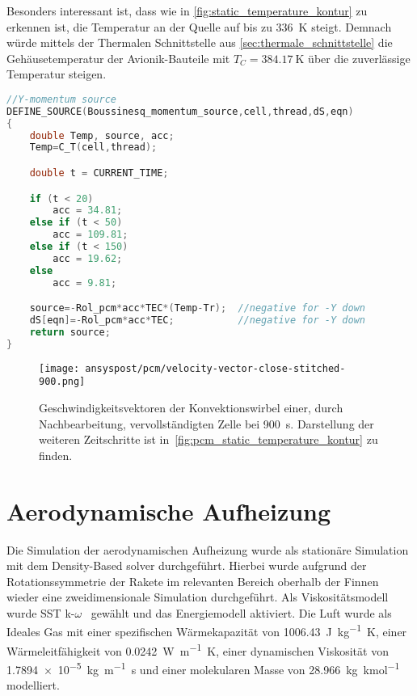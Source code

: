 Besonders interessant ist, dass wie in \ref{fig:static_temperature_kontur} zu erkennen ist, die Temperatur an der Quelle auf bis zu \SI{336}{\kelvin}
steigt. Demnach würde mittels der Thermalen Schnittstelle aus \ref{sec:thermale_schnittstelle} die Gehäusetemperatur der Avionik-Bauteile mit
$T_C = \SI{384,17}{\kelvin}$ über die zuverlässige Temperatur steigen.

\begin{lstlisting}[language=C, float, caption={Boussinesq-Approximation des Auftriebs im \ac{pcm} in der \ac{udf} eicosane.c}, label={lst:udf_bossinesque}]
//Y-momentum source
DEFINE_SOURCE(Boussinesq_momentum_source,cell,thread,dS,eqn)
{
	double Temp, source, acc;
	Temp=C_T(cell,thread);

	double t = CURRENT_TIME;

	if (t < 20)
		acc = 34.81;
	else if (t < 50)
		acc = 109.81;
	else if (t < 150)
		acc = 19.62;
	else
		acc = 9.81;

	source=-Rol_pcm*acc*TEC*(Temp-Tr);  //negative for -Y down
	dS[eqn]=-Rol_pcm*acc*TEC; 			//negative for -Y down
	return source;
}
\end{lstlisting}

\begin{figure}
  \centering
  \texttt{[image: ansyspost/pcm/velocity-vector-close-stitched-900.png]}
  \caption{Geschwindigkeitsvektoren der Konvektionswirbel einer, durch Nachbearbeitung, vervollständigten Zelle
  bei \SI{900}{\second}. Darstellung der weiteren Zeitschritte ist in~\ref{fig:pcm_static_temperature_kontur} zu finden.}\label{fig:pcm_vectoren_stitched}
\end{figure}

\section{Aerodynamische Aufheizung}\label{sec:sim_aerodynamisch}
Die Simulation der aerodynamischen Aufheizung wurde als stationäre Simulation mit dem Density-Based solver durchgeführt. Hierbei wurde
aufgrund der Rotationssymmetrie der Rakete im relevanten Bereich oberhalb der Finnen wieder eine zweidimensionale Simulation durchgeführt.
Als Viskositätsmodell wurde SST k-$\omega$~\cite{Irving-2021} gewählt und das Energiemodell aktiviert.
Die Luft wurde als Ideales Gas mit einer spezifischen Wärmekapazität von \SI{1006.43}{\joule\per\kilogram\kelvin},
einer Wärmeleitfähigkeit von \SI{0.0242}{\watt\per\meter\kelvin}, einer dynamischen Viskosität von \SI{1.7894e-5}{\kilogram\per\meter\second}
und einer molekularen Masse von \SI{28,966}{\kilogram\per\kilo\mole} modelliert.

